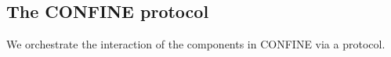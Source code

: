 \subsection{The CONFINE protocol}
We orchestrate the interaction of the components in CONFINE via a protocol.


